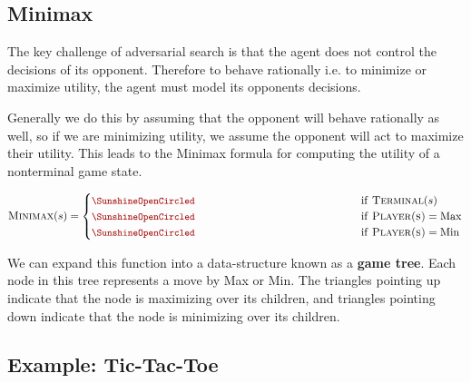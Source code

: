 \documentclass[11pt]{article}
\begin{document}
\subsection{Minimax}

The key challenge of adversarial search is that the agent does not control the decisions of its opponent. Therefore to behave rationally i.e. to minimize or maximize utility, the agent must model its opponents decisions. 

Generally we do this by assuming that the opponent will behave rationally as well, so if we are minimizing utility, we assume the opponent will act to maximize their utility. This leads to the Minimax formula for computing the utility of a nonterminal game state.

\[ \msc{Minimax}(s) = \begin{cases} 
  \censorm{\msc{Utility}(s)} & \mathrm{if\ } \msc{Terminal}(s)  \\
  \censorm{\max_{a \in \msc{Actions}(s)}  \msc{Minimax}(\msc{Result}(s, a))} & \mathrm{if\ } \msc{Player(s)} = \mathrm{Max}  \\
  \censorm{\min_{a \in \msc{Actions}(s) } \msc{Minimax}(\msc{Result}(s, a))} & \mathrm{if\ } \msc{Player(s)} = \mathrm{Min} \end{cases}\] 

We can expand this function into a data-structure known as a \textbf{game tree}. Each node in this tree represents a move by Max or Min. The triangles pointing up indicate that the node is maximizing over its children, and triangles pointing down indicate that the node is minimizing over its children.

\begin{center}
\end{center}



\subsection{Example: Tic-Tac-Toe}
\end{document}
